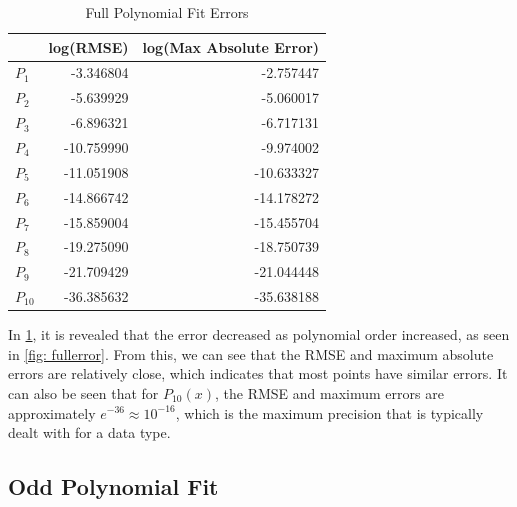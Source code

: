 \documentclass[10pt,a4paper]{article}
\begin{document}
\begin{table}[H]
\centering
\begin{tabular}{l|rr}
\multicolumn{1}{l|}{} & \multicolumn{1}{c}{log(RMSE)} & \multicolumn{1}{c}{log(Max Absolute Error)} \\ \hline
$P_1$                  & -3.346804                     & -2.757447                                  \\
$P_2$                  & -5.639929                     & -5.060017                                   \\
$P_3$                  & -6.896321                     & -6.717131                                   \\
$P_4$                  & -10.759990                    & -9.974002                                    \\
$P_5$                  & -11.051908                    & -10.633327                                  \\
$P_6$                  & -14.866742                    & -14.178272                                  \\
$P_7$                  & -15.859004                    & -15.455704                                 \\
$P_8$                  & -19.275090                    & -18.750739                                \\
$P_9$                  & -21.709429                    & -21.044448                                 \\
$P_{10}$                 & -36.385632                    & -35.638188                                
\end{tabular}
\caption{Full Polynomial Fit Errors}
\label{table: fullerrors}
\end{table}

In \cref{table: fullerrors}, it is revealed that the error decreased as polynomial order increased, as seen in \cref{fig: fullerror}. From this, we can see that the RMSE and maximum absolute errors are relatively close, which indicates that most points have similar errors. It can also be seen that for $P_{10}(x)$, the RMSE and maximum errors are approximately $e^{-36} \approx 10^{-16}$, which is the maximum precision that is typically dealt with for a data type.

\subsection*{Odd Polynomial Fit}
\end{document}
